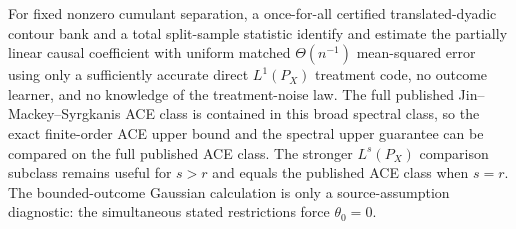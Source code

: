 For fixed nonzero cumulant separation, a once-for-all certified translated-dyadic contour bank and a total split-sample statistic identify and estimate the partially linear causal coefficient with uniform matched \(\Theta(n^{-1})\) mean-squared error using only a sufficiently accurate direct \(L^1(P_X)\) treatment code, no outcome learner, and no knowledge of the treatment-noise law. The full published Jin--Mackey--Syrgkanis ACE class is contained in this broad spectral class, so the exact finite-order ACE upper bound and the spectral upper guarantee can be compared on the full published ACE class. The stronger \(L^s(P_X)\) comparison subclass remains useful for \(s>r\) and equals the published ACE class when \(s=r\). The bounded-outcome Gaussian calculation is only a source-assumption diagnostic: the simultaneous stated restrictions force \(\theta_0=0\).